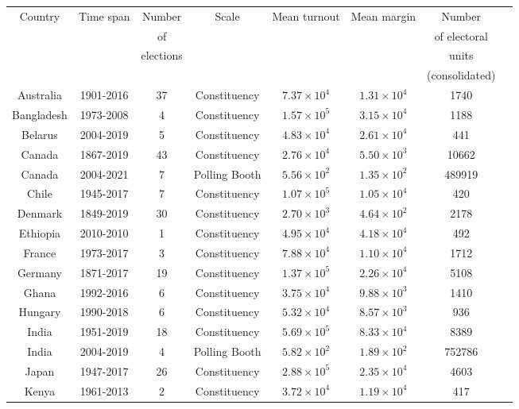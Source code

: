 \documentclass[reprint,aps,prl,showpacs,twocolumn, superscriptaddress]{revtex4-2}
\begin{document}
\begin{table}[h]
\centering
\begin{tabular}{|c|c|c|c|c|c|c|c|}
\hline
Country & Time span & Number & Scale    & Mean turnout & Mean margin  & Number \\ 
 &  & of  &  &  &  & of electoral \\ 
 &  & elections  &  &  &  & units \\ 
 &  &  &  &  &  & (consolidated) \\ \hline
Australia & 1901-2016 & 37 & Constituency & $7.37\times 10^{4}$ & $1.31\times 10^{4}$ & 1740\\ \hline
Bangladesh & 1973-2008 & 4 & Constituency & $1.57\times 10^{5}$ & $3.15\times 10^{4}$ & 1188\\ \hline
Belarus & 2004-2019 & 5 & Constituency & $4.83\times 10^{4}$ & $2.61\times 10^{4}$ & 441\\ \hline
Canada & 1867-2019 & 43 & Constituency & $2.76\times 10^{4}$ & $5.50\times 10^{3}$ & 10662\\ \hline
Canada & 2004-2021 & 7 & Polling Booth & $5.56\times 10^{2}$ & $1.35\times 10^{2}$ & 489919\\ \hline
Chile & 1945-2017 & 7 & Constituency & $1.07\times 10^{5}$ & $1.05\times 10^{4}$ & 420\\ \hline
Denmark & 1849-2019 & 30 & Constituency & $2.70\times 10^{3}$ & $4.64\times 10^{2}$ & 2178\\ \hline
Ethiopia & 2010-2010 & 1 & Constituency & $4.95\times 10^{4}$ & $4.18\times 10^{4}$ & 492\\ \hline
France & 1973-2017 & 3 & Constituency & $7.88\times 10^{4}$ & $1.10\times 10^{4}$ & 1712\\ \hline
Germany & 1871-2017 & 19 & Constituency & $1.37\times 10^{5}$ & $2.26\times 10^{4}$ & 5108\\ \hline
Ghana & 1992-2016 & 6 & Constituency & $3.75\times 10^{4}$ & $9.88\times 10^{3}$ & 1410\\ \hline
Hungary & 1990-2018 & 6 & Constituency & $5.32\times 10^{4}$ & $8.57\times 10^{3}$ & 936\\ \hline
India & 1951-2019 & 18 & Constituency & $5.69\times 10^{5}$ & $8.33\times 10^{4}$ & 8389\\ \hline
India & 2004-2019 & 4 & Polling Booth & $5.82\times 10^{2}$ & $1.89\times 10^{2}$ & 752786\\ \hline
Japan & 1947-2017 & 26 & Constituency & $2.88\times 10^{5}$ & $2.35\times 10^{4}$ & 4603\\ \hline
Kenya & 1961-2013 & 2 & Constituency & $3.72\times 10^{4}$ & $1.19\times 10^{4}$ & 417\\ \hline

\end{tabular}
\end{table}
\end{document}
